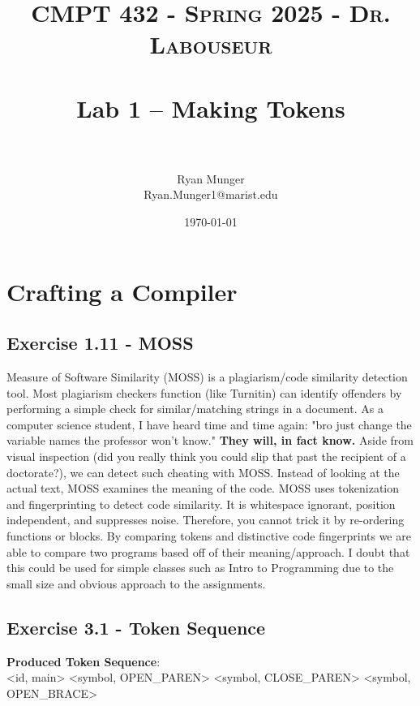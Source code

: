 \documentclass[letterpaper, 10pt]{article}
\title{	
   \normalfont \normalsize 
   \textsc{CMPT 432 - Spring 2025 - Dr. Labouseur} \\[10pt] %
   \horrule{0.5pt} \\[0.25cm] 	%
   \huge Lab 1 -- Making Tokens \\     	    %
   \horrule{0.5pt} \\[0.25cm] 	%
}
\author{Ryan Munger \\ \normalsize Ryan.Munger1@marist.edu}
\date{\normalsize\today} 	%
\begin{document}
\maketitle %


\section{Crafting a Compiler}
\subsection{Exercise 1.11 - MOSS}
Measure of Software Similarity (MOSS) is a plagiarism/code similarity detection tool. Most plagiarism checkers function (like Turnitin) can identify offenders by performing a simple check for similar/matching strings in a document. As a computer science student, I have heard time and time again: "bro just change the variable names the professor won't know." \textbf{They will, in fact know.} Aside from visual inspection (did you really think you could slip that past the recipient of a doctorate?), we can detect such cheating with MOSS. Instead of looking at the actual text, MOSS examines the meaning of the code. MOSS uses tokenization and fingerprinting to detect code similarity. It is whitespace ignorant, position independent, and suppresses noise. Therefore, you cannot trick it by re-ordering functions or blocks. By comparing tokens and distinctive code fingerprints we are able to compare two programs based off of their meaning/approach. I doubt that this could be used for simple classes such as Intro to Programming due to the small size and obvious approach to the assignments. 

\newpage
\subsection{Exercise 3.1 - Token Sequence}
\lstset{style=mystyle, language=c}

\textbf{Produced Token Sequence}: \\
\textless id, main\textgreater
\textless symbol, OPEN\_PAREN\textgreater
\textless symbol, CLOSE\_PAREN\textgreater
\textless symbol, OPEN\_BRACE\textgreater\\
\end{document}
